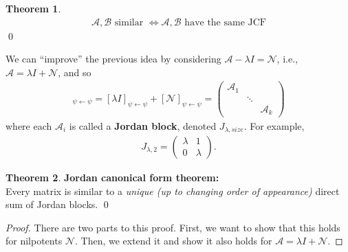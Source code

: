 \documentclass{book}
\theoremstyle{definition}
\newtheorem{thm}{Theorem}[section]
\newcommand{\A}{\mathcal{A}}
\begin{document}
\begin{thm}
	\begin{align*}
	\boxed{\A, \mathcal{B} \text{ similar } \iff \A, \mathcal{B} \text{ have the same JCF}}
	\end{align*}\qed
\end{thm}

We can ``improve'' the previous idea by considering $\A - \lambda I = \mathcal{N}$, i.e., $\A = \lambda I + \mathcal{N}$, and so
\begin{align*}
[\lambda I + \mathcal{N}]_{\psi \leftarrow \psi} = [\lambda I]_{\psi \leftarrow \psi} + [\mathcal{N}]_{\psi\leftarrow\psi}  = \begin{pmatrix}
\A_1 & & \\
& \ddots & \\
& & \A_k
\end{pmatrix}
\end{align*}
where each $\A_i$ is called a \textbf{Jordan block}, denoted $J_{\lambda, size}$. For example,
\begin{align*}
J_{\lambda, 2} = \begin{pmatrix}
\lambda & 1\\0& \lambda 
\end{pmatrix}.
\end{align*}

\begin{thm}\textbf{Jordan canonical form theorem:}\\
	Every matrix is similar to a \textit{unique (up to changing order of appearance)} direct sum of Jordan blocks. \qed
	
	\begin{proof}
		There are two parts to this proof. First, we want to show that this holds for nilpotents $\mathcal{N}$. Then, we extend it and show it also holds for $\A = \lambda I + \mathcal{N}$.
	\end{proof}
\end{thm}
\end{document}
